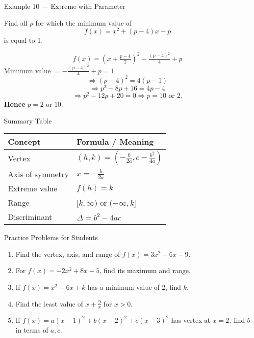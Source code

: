 \documentclass[12pt]{beamer}
\begin{document}
\begin{frame}{Example 10 — Extreme with Parameter}

Find all $p$ for which the minimum value of
\[
f(x) = x^2 + (p-4)x + p
\]
is equal to $1$.

\pause
\[
f(x) = (x + \tfrac{p-4}{2})^2 - \tfrac{(p-4)^2}{4} + p
\]
Minimum value $= -\tfrac{(p-4)^2}{4} + p = 1$
\[
\Rightarrow (p-4)^2 = 4(p-1)
\]
\[
\Rightarrow p^2 - 8p + 16 = 4p - 4
\]
\[
\Rightarrow p^2 - 12p + 20 = 0
\Rightarrow p = 10 \text{ or } 2.
\]
\textbf{Hence } $p = 2$ or $10.$

\end{frame}

\begin{frame}{Summary Table}

\begin{center}
\begin{tabular}{l|l}
\textbf{Concept} & \textbf{Formula / Meaning} \\ \hline
Vertex & $(h, k) = (-\tfrac{b}{2a}, c - \tfrac{b^2}{4a})$ \\
Axis of symmetry & $x = -\tfrac{b}{2a}$ \\
Extreme value & $f(h) = k$ \\
Range & $[k, \infty)$ or $(-\infty, k]$ \\
Discriminant & $\Delta = b^2 - 4ac$
\end{tabular}
\end{center}

\end{frame}

\begin{frame}{Practice Problems for Students}

\begin{enumerate}
    \item Find the vertex, axis, and range of $f(x) = 3x^2 + 6x - 9$.
    \item For $f(x) = -2x^2 + 8x - 5$, find its maximum and range.
    \item If $f(x) = x^2 - 6x + k$ has a minimum value of $2$, find $k$.
    \item Find the least value of $x + \frac{9}{x}$ for $x > 0$.
    \item If $f(x) = a(x-1)^2 + b(x-2)^2 + c(x-3)^2$ has vertex at $x=2$, find $b$ in terms of $a,c$.
\end{enumerate}

\end{frame}
\end{document}
